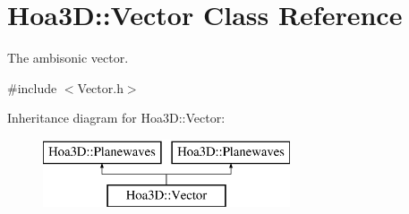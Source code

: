 \hypertarget{class_hoa3_d_1_1_vector}{\section{Hoa3\-D\-:\-:Vector Class Reference}
\label{class_hoa3_d_1_1_vector}
}


The ambisonic vector.  




{\ttfamily \#include $<$Vector.\-h$>$}

Inheritance diagram for Hoa3\-D\-:\-:Vector\-:\begin{figure}[H]
\begin{center}
\leavevmode
\includegraphics[height=2.000000cm]{class_hoa3_d_1_1_vector}
\end{center}
\end{figure}
